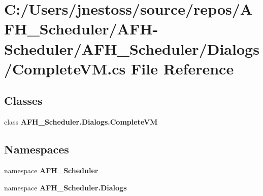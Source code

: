 \section{C\+:/\+Users/jnestoss/source/repos/\+A\+F\+H\+\_\+\+Scheduler/\+A\+F\+H-\/\+Scheduler/\+A\+F\+H\+\_\+\+Scheduler/\+Dialogs/\+Complete\+VM.cs File Reference}
\label{_complete_v_m_8cs}
\subsection*{Classes}
\begin{DoxyCompactItemize}
\item 
class \textbf{ A\+F\+H\+\_\+\+Scheduler.\+Dialogs.\+Complete\+VM}
\end{DoxyCompactItemize}
\subsection*{Namespaces}
\begin{DoxyCompactItemize}
\item 
namespace \textbf{ A\+F\+H\+\_\+\+Scheduler}
\item 
namespace \textbf{ A\+F\+H\+\_\+\+Scheduler.\+Dialogs}
\end{DoxyCompactItemize}
